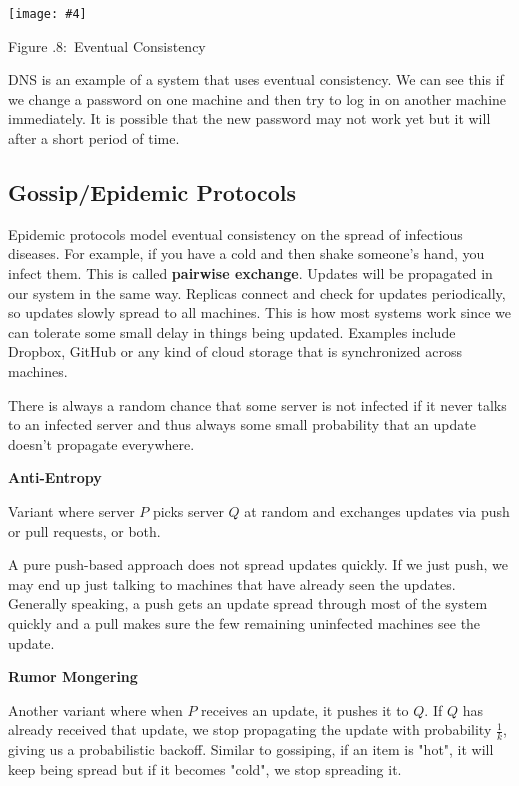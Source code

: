 \documentclass[twoside]{article}
\newcounter{lecnum}
\newcommand{\fig}[4]{
            \centerline{\texttt{[image: \#4]}}
            \begin{center}
            Figure \thelecnum.#1:~#3
            \end{center}
    }
\begin{document}
\fig{8}{0.8}{Eventual Consistency}{eventually}

DNS is an example of a system that uses eventual consistency. We can see this if we change a password on one machine and then try to log in on another machine immediately. It is possible that the new password may not work yet but it will after a short period of time.

\subsection{Gossip/Epidemic Protocols}

Epidemic protocols model eventual consistency on the spread of infectious diseases. For example, if you have a cold and then shake someone's hand, you infect them. This is called \textbf{pairwise exchange}. Updates will be propagated in our system in the same way. Replicas connect and check for updates periodically, so updates slowly spread to all machines. This is how most systems work since we can tolerate some small delay in things being updated. Examples include Dropbox, GitHub or any kind of cloud storage that is synchronized across machines.

There is always a random chance that some server is not infected if it never talks to an infected server and thus always some small probability that an update doesn't propagate everywhere.

\begin{description}
    
    \item \textbf{Anti-Entropy}

    Variant where server $P$ picks server $Q$ at random and exchanges updates via push or pull requests, or both.
    
    A pure push-based approach does not spread updates quickly. If we just push, we may end up just talking to machines that have already seen the updates. Generally speaking, a push gets an update spread through most of the system quickly and a pull makes sure the few remaining uninfected machines see the update.
    
    \item \textbf{Rumor Mongering}
    
    Another variant where when $P$ receives an update, it pushes it to $Q$. If $Q$ has already received that update, we stop propagating the update with probability $\frac{1}{k}$, giving us a probabilistic backoff. Similar to gossiping, if an item is "hot", it will keep being spread but if it becomes "cold", we stop spreading it.

\end{description}
\end{document}
